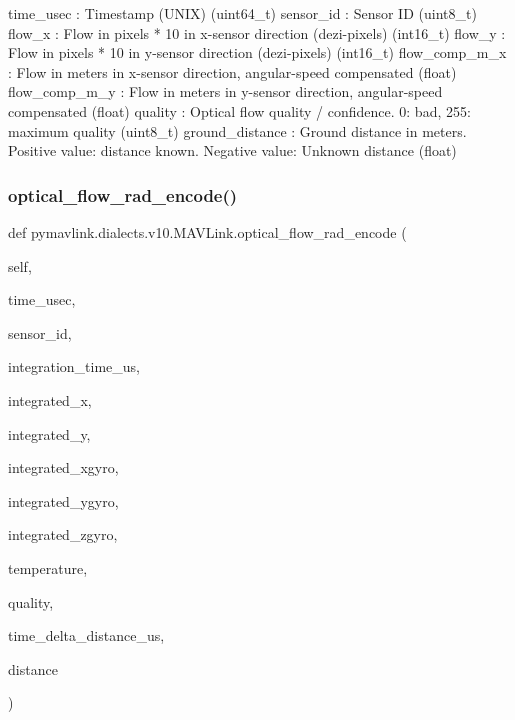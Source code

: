 \begin{DoxyVerb}
\begin{DoxyVerb}
\begin{DoxyVerb}
\begin{DoxyVerb}
\begin{DoxyVerb}
time_usec                 : Timestamp (UNIX) (uint64_t)
sensor_id                 : Sensor ID (uint8_t)
flow_x                    : Flow in pixels * 10 in x-sensor direction (dezi-pixels) (int16_t)
flow_y                    : Flow in pixels * 10 in y-sensor direction (dezi-pixels) (int16_t)
flow_comp_m_x             : Flow in meters in x-sensor direction, angular-speed compensated (float)
flow_comp_m_y             : Flow in meters in y-sensor direction, angular-speed compensated (float)
quality                   : Optical flow quality / confidence. 0: bad, 255: maximum quality (uint8_t)
ground_distance           : Ground distance in meters. Positive value: distance known. Negative value: Unknown distance (float)\end{DoxyVerb}
 \mbox{\label{classpymavlink_1_1dialects_1_1v10_1_1MAVLink_a4ebc1f0ddd8f9a6f4e2a97f6f6ae00c4}} 
\subsubsection{\texorpdfstring{optical\+\_\+flow\+\_\+rad\+\_\+encode()}{optical\_flow\_rad\_encode()}}
{\footnotesize\ttfamily def pymavlink.\+dialects.\+v10.\+M\+A\+V\+Link.\+optical\+\_\+flow\+\_\+rad\+\_\+encode (\begin{DoxyParamCaption}\item[{}]{self,  }\item[{}]{time\+\_\+usec,  }\item[{}]{sensor\+\_\+id,  }\item[{}]{integration\+\_\+time\+\_\+us,  }\item[{}]{integrated\+\_\+x,  }\item[{}]{integrated\+\_\+y,  }\item[{}]{integrated\+\_\+xgyro,  }\item[{}]{integrated\+\_\+ygyro,  }\item[{}]{integrated\+\_\+zgyro,  }\item[{}]{temperature,  }\item[{}]{quality,  }\item[{}]{time\+\_\+delta\+\_\+distance\+\_\+us,  }\item[{}]{distance }\end{DoxyParamCaption})}


\end{DoxyVerb}
\end{DoxyVerb}
\end{DoxyVerb}
\end{DoxyVerb}
